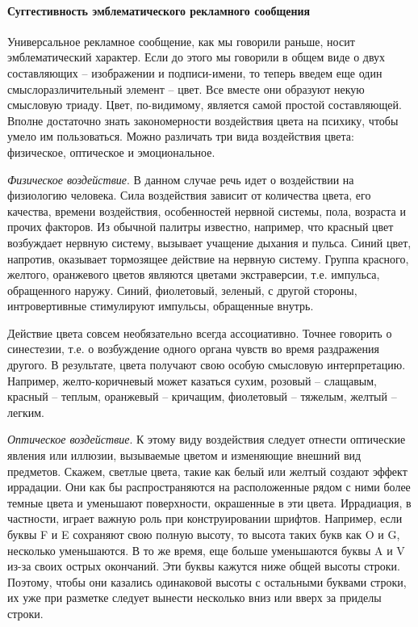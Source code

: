 \paragraph{Суггестивность эмблематического рекламного сообщения}
Универсальное рекламное сообщение, как мы говорили раньше, носит эмблематический
характер. Если  до этого мы говорили в общем виде о двух составляющих --
изображении и подписи-имени, то теперь введем еще один смыслоразличительный
элемент -- цвет. Все вместе они образуют некую смысловую триаду. Цвет,
по-видимому, является самой простой составляющей. Вполне достаточно знать
закономерности воздействия цвета на психику, чтобы умело им пользоваться.
Можно различать три вида воздействия цвета: физическое, оптическое и
эмоциональное\autocites{tsoygner1971}{serov1997estetika}{kandinsky2001dohovnom}.

\emph{Физическое воздействие}. В данном случае речь идет о воздействии на
  физиологию человека. Сила воздействия зависит от количества цвета,
  его качества, времени воздействия, особенностей нервной системы, пола,
  возраста и прочих факторов. Из обычной палитры известно, например, что
  красный цвет возбуждает нервную систему, вызывает учащение дыхания и
  пульса. Синий цвет, напротив, оказывает тормозящее действие на нервную
  систему. Группа красного, желтого, оранжевого цветов являются цветами
  экстраверсии, т.е. импульса, обращенного наружу. Синий, фиолетовый,
  зеленый, с другой стороны,  интровертивные стимулируют импульсы, обращенные
  внутрь.

  Действие цвета совсем необязательно всегда ассоциативно. Точнее говорить о
  синестезии, т.е. о возбуждение одного органа чувств во время раздражения
  другого. В результате, цвета получают свою особую смысловую интерпретацию.
  Например, желто-коричневый может казаться сухим,  розовый -- слащавым,
  красный -- теплым, оранжевый -- кричащим, фиолетовый -- тяжелым, желтый -- легким.

\emph{Оптическое воздействие}. К этому виду воздействия следует отнести
  оптические явления или иллюзии, вызываемые цветом и изменяющие внешний вид
  предметов. Скажем, светлые цвета, такие как белый или желтый создают эффект
  иррадации. Они как бы распространяются на расположенные рядом с ними более
  темные цвета и уменьшают поверхности, окрашенные в эти цвета. Иррадиация, в частности, играет важную
  роль при конструировании шрифтов. Например, если буквы F и E сохраняют свою полную высоту, то высота
  таких букв как O и G, несколько уменьшаются. В то же время, еще больше уменьшаются буквы A и V из-за
  своих острых окончаний. Эти буквы кажутся ниже общей высоты строки.  Поэтому, чтобы они казались
  одинаковой высоты с остальными буквами строки, их уже при разметке следует вынести несколько вниз
  или вверх за приделы строки.

